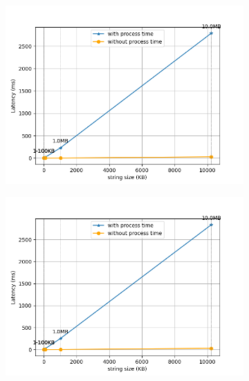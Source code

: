 \begin{figure}[htb]
    \begin{subfigure}[b]{0.49\textwidth}
        \centering
        \includegraphics[width=\textwidth]{figures/tests/proportional_tests/Average_string_messages_sending_time_of_100_tests_1KB_to_10MB.png}\hfill 
        \caption{} \label{fig: proportional-stringsize-a}
    \end{subfigure}
    \begin{subfigure}[b]{0.49\textwidth}
        \centering
        \includegraphics[width=\textwidth]{figures/tests/proportional_tests/Average_string_messages_receiving_time_of_100_tests_1KB_to_10MB.png}\hfill 
        \caption{} \label{fig: proportional-stringsize-b}

\end{subfigure}
\end{figure}
